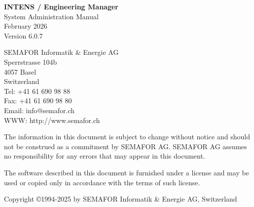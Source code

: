 \documentclass[a4paper,DIV=12,11pt,parskip=half]{scrartcl}
\makeatletter
\def\doc@version{Version 6.0.7}
\def\pub@date{February 2026}
\makeatother
\begin{document}
\renewcommand{\arraystretch}{1.5}
\begin{titlepage}
\begin{center}
\vspace*{1.5cm}

{\bfseries \Huge INTENS / Engineering Manager\\[3ex]}
{\LARGE System Administration Manual\\[3ex]}
\pub@date \\
\doc@version \\

\end{center}
\vspace{8cm}
SEMAFOR Informatik \& Energie AG\\
Sperrstrasse 104b\\
4057 Basel\\
Switzerland\\[2ex]
Tel: +41 61 690 98 88\\
Fax: +41 61 690 98 80\\
Email: info@semafor.ch\\
WWW: http://www.semafor.ch
\end{titlepage}
\thispagestyle{empty}
\vspace{2cm}

The information in this document is subject to change without notice and
should not be construed as a commitment by SEMAFOR AG. SEMAFOR AG
assumes no responsibility for any errors that may appear in this document.

The software described in this document is furnished under a license and
may be used or copied only in accordance with the terms of such license.

Copyright \copyright 1994-2025 by SEMAFOR Informatik \& Energie AG, Switzerland\\[2ex]
\\[4ex]
\end{document}
